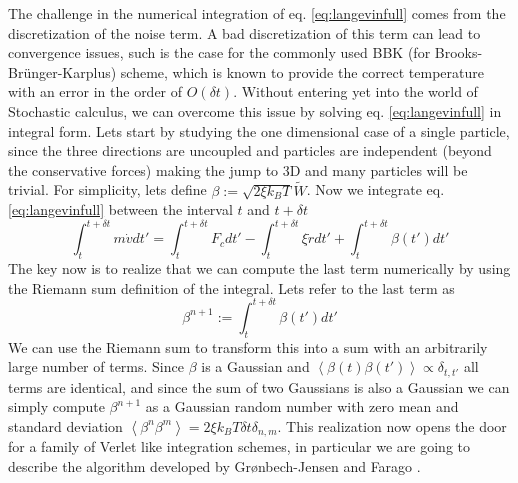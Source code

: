 \documentclass[ twoside,openright,titlepage,numbers=noenddot,%
headinclude,footinclude,cleardoublepage=empty,abstract=on,
BCOR=5mm,paper=a4,fontsize=11pt, dvipsnames
]{scrreprt}
\newcommand{\dt}{\delta t}
\newcommand{\kT}{k_B T}
\begin{document}
The challenge in the numerical integration of eq. \eqref{eq:langevinfull} comes from the discretization of the noise term.
A bad discretization of this term can lead to convergence issues, such is the case for the commonly used BBK (for Brooks-Brünger-Karplus) scheme\cite{Brunger1984}, which is known to provide the correct temperature with an error in the order of $O(\dt)$\cite{Wang2003}.
Without entering yet into the world of Stochastic calculus, we can overcome this issue by solving eq. \eqref{eq:langevinfull} in integral form. Lets start by studying the one dimensional case of a single particle, since the three directions are uncoupled and particles are independent (beyond the conservative forces) making the jump to 3D and many particles will be trivial. For simplicity, lets define $\beta := \sqrt{2\xi k_BT}\widetilde{W}$. Now we integrate eq. \eqref{eq:langevinfull} between the interval $t$ and $t+\dt$
\begin{equation}
  \label{eq:langevinriemann}
  \int_t^{t+\dt} m\dot{v}dt' = \int_t^{t+\dt}F_c dt' - \int_t^{t+\dt}\xi\dot{r}dt' + \int_t^{t+\dt}\beta(t')dt'
\end{equation}
The key now is to realize that we can compute the last term numerically by using the Riemann sum definition of the integral. Lets refer to the last term as
\begin{equation}
  \label{eq:langenoisint}
  \beta^{n+1} := \int_t^{t+\dt}\beta(t')dt'
\end{equation}
We can use the Riemann sum to transform this into a sum with an arbitrarily large number of terms. Since $\beta$ is a Gaussian and $\left\langle\beta(t)\beta(t')\right\rangle \propto \delta_{t,t'}$ all terms are identical, and since the sum of two Gaussians is also a Gaussian we can simply compute $\beta^{n+1}$ as a Gaussian random number with zero mean and standard deviation $\left\langle\beta^n\beta^m\right\rangle = 2\xi\kT\dt\delta_{n,m}$.
This realization now opens the door for a family of Verlet like integration schemes, in particular we are going to describe the algorithm developed by Grønbech-Jensen and Farago \cite{Gronbech2013}.
\end{document}
